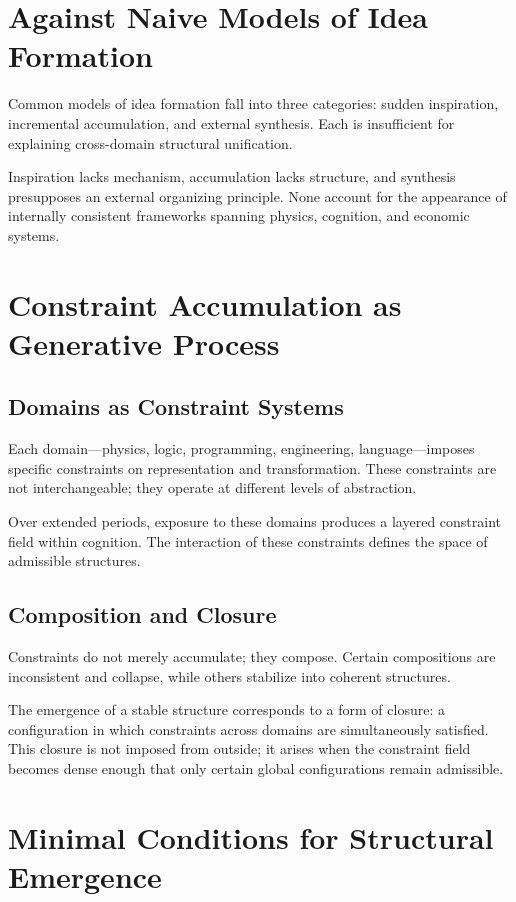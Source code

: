 \documentclass[11pt]{article}
\theoremstyle{plain}
\theoremstyle{definition}
\theoremstyle{remark}
\begin{document}
\section{Against Naive Models of Idea Formation}

Common models of idea formation fall into three categories: sudden
inspiration, incremental accumulation, and external synthesis. Each
is insufficient for explaining cross-domain structural unification.

Inspiration lacks mechanism, accumulation lacks structure, and synthesis
presupposes an external organizing principle. None account for the
appearance of internally consistent frameworks spanning physics,
cognition, and economic systems.

\section{Constraint Accumulation as Generative Process}

\subsection{Domains as Constraint Systems}

Each domain---physics, logic, programming, engineering, language---imposes
specific constraints on representation and transformation. These constraints
are not interchangeable; they operate at different levels of abstraction.

Over extended periods, exposure to these domains produces a layered
constraint field within cognition. The interaction of these constraints
defines the space of admissible structures.

\subsection{Composition and Closure}

Constraints do not merely accumulate; they compose. Certain compositions
are inconsistent and collapse, while others stabilize into coherent
structures.

The emergence of a stable structure corresponds to a form of closure:
a configuration in which constraints across domains are simultaneously
satisfied. This closure is not imposed from outside; it arises when the
constraint field becomes dense enough that only certain global configurations
remain admissible.

\section{Minimal Conditions for Structural Emergence}
\end{document}
